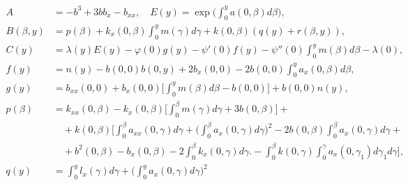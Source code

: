 \begin{align*}


A&=-b^{3}+3bb_{x}-b_{xx},\quad E(y)=\exp\bigg(


\int_{0}^{y} a(0,\beta)d\beta\bigg),\\


%


B(\beta,y)&=p(\beta)+k_{x}(0,\beta)\int_{0}^{y} m(\gamma) d\gamma


+k(0,\beta)(q(y)+r(\beta,y)),\\


%


C(y)&=\lambda(y)E(y)-\varphi(0)g(y)-\psi'(0)f(y)-


\psi''(0)\int_{0}^{y} m(\beta) d\beta-\lambda(0),\\


%


f(y)&=n(y)-b(0,0)b(0,y)+2b_{x}(0,0)-2b(0,0)\int_{0}^{y}


a_{x}(0,\beta) d\beta,\\


%


g(y) &= b_{xx}(0,0)+b_{x}(0,0)\bigg [ \int_{0}^{y} m(\beta) d\beta


-b(0,0)\bigg ]+b(0,0)n(y), \\


%


p(\beta)&=k_{xx}(0,\beta)-k_{x}(0,\beta)\bigg [ \int_{0}^{\beta}


m(\gamma) d\gamma+3b(0,\beta)\bigg]+\\


%


&\quad+k(0,\beta)\bigg [ \int_{0}^{\beta} a_{xx}(0,\gamma) d\gamma


+\bigg (\int_{0}^{\beta} a_{x}(0,\gamma) d\gamma \bigg) ^{2}-


2b(0,\beta)\int_{0}^{\beta} a_{x}(0,\gamma) d\gamma+\\


%


&\quad+b^{2}(0,\beta)-b_{x}(0,\beta)-2\int_{0}^{\beta} k_{x}(0,\gamma)d\gamma


\biggl. -\int_{0}^{\beta} k(0,\gamma)


\int_{0}^{\gamma} a_{x}(0,\gamma_{1}) d\gamma_{1} d\gamma \bigg ], \\


%


q(y) &= \int_{0}^{y} l_{x}(\gamma) d\gamma+\bigg(\int_{0}^{y}


a_{x}(0,\gamma) d\gamma \bigg) ^{2}



\end{align*}

